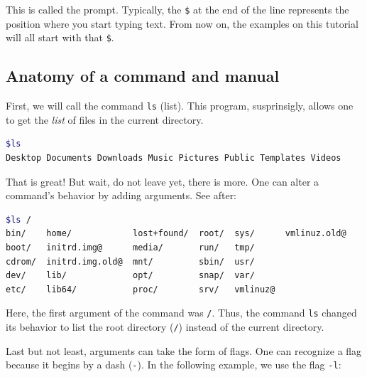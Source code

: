 \documentclass[12pt]{article}
\begin{document}
This is called the prompt. Typically, the \texttt{\$} at the end of the line represents the position where you start typing text.
From now on, the examples on this tutorial will all start with that \texttt{\$}.

\subsection{Anatomy of a command and manual}

First, we will call the command \texttt{ls} (list). This program, susprinsigly, allows one to get the \textit{list} of files in the current directory.

\begin{lstlisting}[language=bash]
$ls
Desktop Documents Downloads Music Pictures Public Templates Videos
\end{lstlisting}

That is great! But wait, do not leave yet, there is more. One can alter a command's behavior by adding arguments. See after:
\begin{lstlisting}[language=bash,breaklines=true]
$ls /
bin/    home/            lost+found/  root/  sys/      vmlinuz.old@
boot/   initrd.img@      media/       run/   tmp/
cdrom/  initrd.img.old@  mnt/         sbin/  usr/
dev/    lib/             opt/         snap/  var/
etc/    lib64/           proc/        srv/   vmlinuz@
\end{lstlisting}

Here, the first argument of the command was \texttt{/}. Thus, the command \texttt{ls} changed its behavior to list the root directory (\texttt{/}) instead of the current directory.

Last but not least, arguments can take the form of flags. One can recognize a flag because it begins by a dash (\texttt{-}). In the following example, we use the flag \texttt{-l}:
\end{document}
